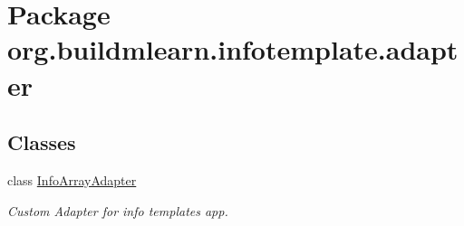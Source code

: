 \hypertarget{namespaceorg_1_1buildmlearn_1_1infotemplate_1_1adapter}{}\section{Package org.\+buildmlearn.\+infotemplate.\+adapter}
\label{namespaceorg_1_1buildmlearn_1_1infotemplate_1_1adapter}
\subsection*{Classes}
\begin{DoxyCompactItemize}
\item 
class \hyperlink{classorg_1_1buildmlearn_1_1infotemplate_1_1adapter_1_1InfoArrayAdapter}{Info\+Array\+Adapter}
\begin{DoxyCompactList}\small\item\em Custom Adapter for info template\textquotesingle{}s app. \end{DoxyCompactList}\end{DoxyCompactItemize}
